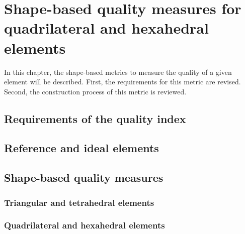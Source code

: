 
\chapter[Shape-based quality measures for elements]{Shape-based quality measures for quadrilateral and hexahedral elements}
\label{chap:02-background}
\thispagestyle{empty}

In this chapter, the shape-based metrics to measure the quality of a given element will be described. First, the requirements for this metric are revised. Second, the construction process of this metric is reviewed. 

\section{Requirements of the quality index}
\label{sec:requirements}


\section{Reference and ideal elements}
\label{sec:reference_and_ideal_elements}


\section{Shape-based quality measures}
\label{sec:Shape-based-quality-measures}

\subsection{Triangular and tetrahedral elements}
\label{ssec:tri-and-tet-elems}

\subsection{Quadrilateral and hexahedral elements}
\label{ssec:quadrilateral-and-hexahedral-elements}


